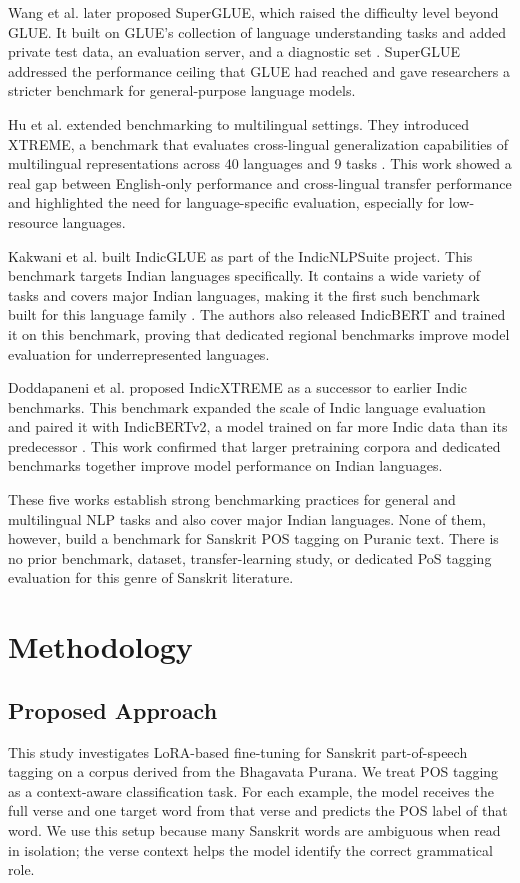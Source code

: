 \documentclass[conference]{IEEEtran}
\begin{document}
Wang et al. later proposed SuperGLUE, which raised the difficulty level beyond GLUE. It built on GLUE's collection of language understanding tasks and added private test data, an evaluation server, and a diagnostic set \cite{wang2019superglue}. SuperGLUE addressed the performance ceiling that GLUE had reached and gave researchers a stricter benchmark for general-purpose language models.

Hu et al. extended benchmarking to multilingual settings. They introduced XTREME, a benchmark that evaluates cross-lingual generalization capabilities of multilingual representations across 40 languages and 9 tasks \cite{hu2020xtreme}. This work showed a real gap between English-only performance and cross-lingual transfer performance and highlighted the need for language-specific evaluation, especially for low-resource languages.

Kakwani et al. built IndicGLUE as part of the IndicNLPSuite project. This benchmark targets Indian languages specifically. It contains a wide variety of tasks and covers major Indian languages, making it the first such benchmark built for this language family \cite{kakwani2020}. The authors also released IndicBERT and trained it on this benchmark, proving that dedicated regional benchmarks improve model evaluation for underrepresented languages.

Doddapaneni et al. proposed IndicXTREME as a successor to earlier Indic benchmarks. This benchmark expanded the scale of Indic language evaluation and paired it with IndicBERTv2, a model trained on far more Indic data than its predecessor \cite{doddapaneni2023}. This work confirmed that larger pretraining corpora and dedicated benchmarks together improve model performance on Indian languages.

These five works establish strong benchmarking practices for general and multilingual NLP tasks and also cover major Indian languages. None of them, however, build a benchmark for Sanskrit POS tagging on Puranic text. There is no prior benchmark, dataset, transfer-learning study, or dedicated PoS tagging evaluation for this genre of Sanskrit literature.

\section{Methodology}

\subsection{Proposed Approach}
This study investigates LoRA-based fine-tuning for Sanskrit part-of-speech tagging on a corpus derived from the Bhagavata Purana. We treat POS tagging as a context-aware classification task. For each example, the model receives the full verse and one target word from that verse and predicts the POS label of that word. We use this setup because many Sanskrit words are ambiguous when read in isolation; the verse context helps the model identify the correct grammatical role.
\end{document}

